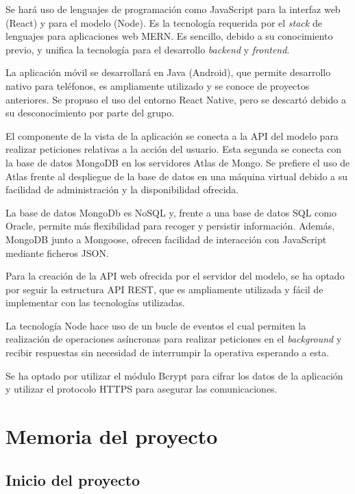 \documentclass{article}
\begin{document}
Se hará uso de lenguajes de programación como JavaScript para la interfaz web (React) y para el modelo (Node). Es la tecnología requerida por el \textit{stack} de lenguajes para aplicaciones web MERN. Es sencillo, debido a su conocimiento previo, y unifica la tecnología para el desarrollo \textit{backend} y \textit{frontend}.
 
La aplicación móvil se desarrollará en Java (Android), que permite desarrollo nativo para teléfonos, es ampliamente utilizado y se conoce de proyectos anteriores. Se propuso el uso del entorno React Native, pero se descartó debido a su desconocimiento por parte del grupo.
 
El componente de la vista de la aplicación se conecta a la API del modelo para realizar peticiones relativas a la acción del usuario. Esta segunda se conecta con la base de datos MongoDB en los servidores Atlas de Mongo. Se prefiere el uso de Atlas frente al despliegue de la base de datos en una máquina virtual debido a su facilidad de administración y la disponibilidad ofrecida.
 
\pagebreak
 
La base de datos MongoDb es NoSQL y, frente a una base de datos SQL como Oracle, permite más flexibilidad para recoger y persistir información. Además, MongoDB junto a Mongoose, ofrecen facilidad de interacción con JavaScript mediante ficheros JSON.
 
Para la creación de la API web ofrecida por el servidor del modelo, se ha optado por seguir la estructura API REST, que es ampliamente utilizada y fácil de implementar con las tecnologías utilizadas.
 
La tecnología Node hace uso de un bucle de eventos el cual permiten la realización de operaciones asíncronas para realizar peticiones en el \textit{background} y recibir respuestas sin necesidad de interrumpir la operativa esperando a esta.
 
Se ha optado por utilizar el módulo Bcrypt para cifrar los datos de la aplicación y utilizar el protocolo HTTPS para asegurar las comunicaciones.
 
\pagebreak
 
\section{Memoria del proyecto}
 
\subsection{Inicio del proyecto}
 
\end{document}
